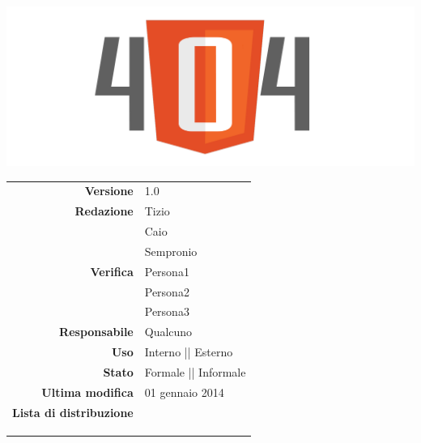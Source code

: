 \thispagestyle{empty}

\begin{titlepage}

	\begin{center}
	\begin{Huge}
		\textbf{\gruppo} \\
	\end{Huge}
	\vspace{0.5cm}
	\begin{Large}
		\textbf{\capitolato}
	\end{Large}
	
	\vspace{1cm}

	\includegraphics[scale=0.35]{img/logo404.png}
	\vspace{1cm}
	\begin{Huge}
		\textbf{\titDoc}
	\end{Huge}
	
	\vspace{1cm}
	
	\begin{table}[h]
	\begin{center}
	\begin{tabular}{r | l}
		\textbf{Versione} & 1.0 \\
		\textbf{Redazione} & Tizio \\ 
			& Caio \\ 
			& Sempronio \\
		\textbf{Verifica} & Persona1 \\ 
			& Persona2 \\ 
			& Persona3 \\
		\textbf{Responsabile} & Qualcuno \\
		\textbf{Uso} & Interno || Esterno \\
		\textbf{Stato} & Formale || Informale \\
		\textbf{Ultima modifica} & 01 gennaio 2014 \\
		\textbf{Lista di distribuzione} & \gruppo \\ 
			& \Vardanega \\
			& \Cardin \\
			& \Zucchetti \\
	\end{tabular}
	\end{center}
	\end{table}
	\end{center}
\end{titlepage}